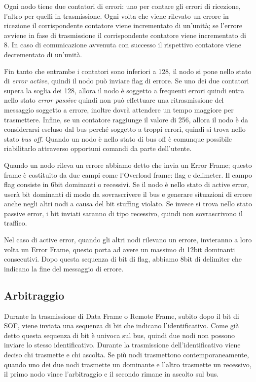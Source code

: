 \documentclass[a4paper,10pt]{book}
\begin{document}
Ogni nodo tiene due contatori di errori: uno per contare gli errori
di ricezione, l'altro per quelli in trasmissione. Ogni volta che
viene rilevato un errore in ricezione il corrispondente contatore
viene incrementato di un'unità; se l'errore avviene in fase di
trasmissione il corrispondente contatore viene incrementato di 8. In
caso di comunicazione avvenuta con successo il rispettivo contatore
viene decrementato di un'unità.

Fin tanto che entrambe i contatori sono inferiori a 128, il nodo si
pone nello stato di \textit{error active}, quindi il nodo può inviare
flag di errore. Se uno dei due contatori supera la soglia dei 128,
allora il nodo è soggetto a frequenti errori quindi entra nello stato
\textit{error passive} quindi non può effettuare una ritrasmissione
del messaggio soggetto a errore, inoltre dovrà attendere un tempo
maggiore per trasmettere. Infine, se un contatore raggiunge il valore
di 256, allora il nodo è da considerarsi escluso dal bus perché
soggetto a troppi errori, quindi si trova nello stato \textit{bus
off}. Quando un nodo è nello stato di bus off è comunque possibile
riabilitarlo attraverso opportuni comandi da parte dell'utente.

Quando un nodo rileva un errore abbiamo detto che invia un Error
Frame; questo frame è costituito da due campi come l'Overload frame:
flag e delimeter. Il campo flag consiste in 6bit dominanti o
recessivi. Se il nodo è nello stato di active error, userà bit
dominanti di modo da sovrascrivere il bus e generare situazioni di
errore anche negli altri nodi a causa del bit stuffing violato. Se
invece si trova nello stato passive error, i bit inviati saranno di
tipo recessivo, quindi non sovrascrivono il traffico.

Nel caso di active error, quando gli altri nodi rilevano un errore,
invieranno a loro volta un Error Frame, questo porta ad avere un
massimo di 12bit dominanti consecutivi. Dopo questa sequenza di bit
di flag, abbiamo 8bit di delimiter che indicano la fine del messaggio
di errore.

\subsection{Arbitraggio}
Durante la trasmissione di Data Frame o Remote Frame, subito dopo il
bit di SOF, viene inviata una sequenza di bit che indicano
l'identificativo. Come già detto questa sequenza di bit è univoca sul
bus, quindi due nodi non possono inviare lo stesso identificativo.
Durante la trasmissione dell'identificativo viene deciso chi
trasmette e chi ascolta. Se più nodi trasmettono contemporaneamente,
quando uno dei due nodi trasmette un dominante e l'altro trasmette
un recessivo, il primo nodo vince l'arbitraggio e il secondo rimane
in ascolto sul bus.
\end{document}
